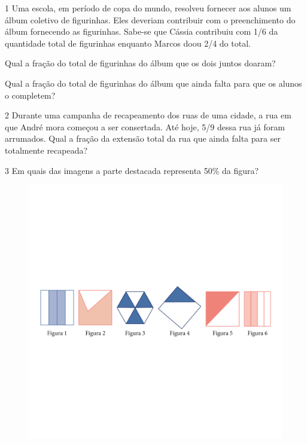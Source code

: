
\num{1} Uma escola, em período de copa do mundo, resolveu fornecer aos
alunos um álbum coletivo de figurinhas. Eles deveriam contribuir com o
preenchimento do álbum fornecendo as figurinhas. Sabe-se que Cássia
contribuiu com 1/6 da quantidade total de figurinhas enquanto Marcos doou 2/4 do total.

\begin{escolha}
\item
  Qual a fração do total de figurinhas do álbum que os dois juntos doaram?


\item
  Qual a fração do total de figurinhas do álbum que ainda falta para que os
  alunos o completem?

\end{escolha}


\num{2} Durante uma campanha de recapeamento dos ruas de uma cidade, a rua
em que André mora começou a ser consertada. Até hoje, 5/9 dessa rua já
foram arrumados. Qual a fração da extensão total da rua que ainda falta para ser totalmente recapeada?



\num{3} Em quais das imagens a parte destacada representa 50\% da figura?

\begin{figure}[htpb!]
\includegraphics[width=\textwidth]{../ilustracoes/MAT5/SAEB_5ANO_MAT_figura68.png}
\end{figure}

